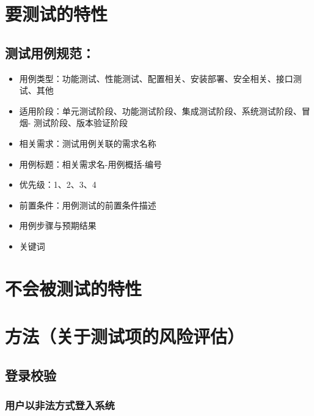 \documentclass[hyperref, a4paper]{ctexart}
\providecommand{\tightlist}{%
  \setlength{\itemsep}{0pt}\setlength{\parskip}{0pt}}
\begin{document}
\hypertarget{ux8981ux6d4bux8bd5ux7684ux7279ux6027}{%
\section{要测试的特性}\label{ux8981ux6d4bux8bd5ux7684ux7279ux6027}}

\hypertarget{ux6d4bux8bd5ux7528ux4f8bux89c4ux8303}{%
\subsection{测试用例规范：}\label{ux6d4bux8bd5ux7528ux4f8bux89c4ux8303}}

\begin{itemize}
\tightlist
\item
  用例类型：功能测试、性能测试、配置相关、安装部署、安全相关、接口测试、其他
\item
  适用阶段：单元测试阶段、功能测试阶段、集成测试阶段、系统测试阶段、冒烟-
  测试阶段、版本验证阶段
\item
  相关需求：测试用例关联的需求名称
\item
  用例标题：相关需求名-用例概括-编号
\item
  优先级：1、2、3、4
\item
  前置条件：用例测试的前置条件描述
\item
  用例步骤与预期结果
\item
  关键词
\end{itemize}

\hypertarget{ux4e0dux4f1aux88abux6d4bux8bd5ux7684ux7279ux6027}{%
\section{不会被测试的特性}\label{ux4e0dux4f1aux88abux6d4bux8bd5ux7684ux7279ux6027}}

\hypertarget{ux65b9ux6cd5ux5173ux4e8eux6d4bux8bd5ux9879ux7684ux98ceux9669ux8bc4ux4f30}{%
\section{方法（关于测试项的风险评估）}\label{ux65b9ux6cd5ux5173ux4e8eux6d4bux8bd5ux9879ux7684ux98ceux9669ux8bc4ux4f30}}

\hypertarget{ux767bux5f55ux6821ux9a8c}{%
\subsection{登录校验}\label{ux767bux5f55ux6821ux9a8c}}

\hypertarget{ux7528ux6237ux4ee5ux975eux6cd5ux65b9ux5f0fux767bux5165ux7cfbux7edf}{%
\subsubsection{用户以非法方式登入系统}\label{ux7528ux6237ux4ee5ux975eux6cd5ux65b9ux5f0fux767bux5165ux7cfbux7edf}}
\end{document}
